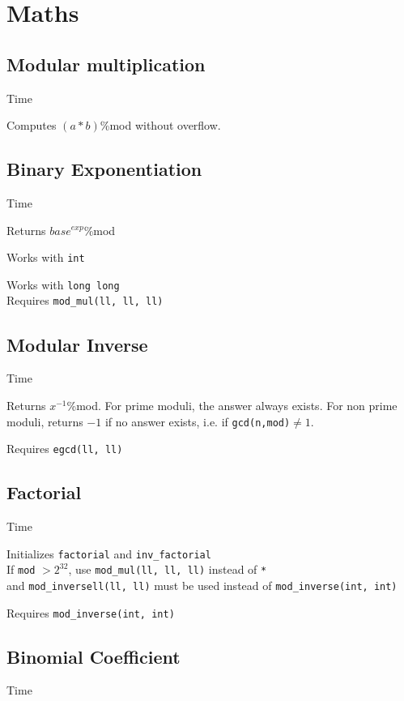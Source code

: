 \section{Maths}


\subsection{Modular multiplication}
 Time

Computes $(a * b)$\:\%\:mod without overflow.



\subsection{Binary Exponentiation}
 Time

Returns ${base^{exp}}$\:\%\:mod

Works with \verb|int|


Works with \verb|long long| \\
Requires \verb|mod_mul(ll, ll, ll)|



\subsection{Modular Inverse}
 Time

Returns ${x^{-1}}$\:\%\:mod. For prime moduli, the answer always exists. For non prime moduli, returns $-1$ if no answer exists, i.e. if \verb|gcd(n,mod)|$ \neq 1$.

Requires \verb|egcd(ll, ll)|



\subsection{Factorial}
 Time

Initializes \verb|factorial| and \verb|inv_factorial| \\
If \verb|mod| $> 2^{32}$, use \verb|mod_mul(ll, ll, ll)| instead of \verb|*| \\
and \verb|mod_inversell(ll, ll)| must be used instead of \verb|mod_inverse(int, int)|

Requires \verb|mod_inverse(int, int)|



\subsection{Binomial Coefficient}
 Time

